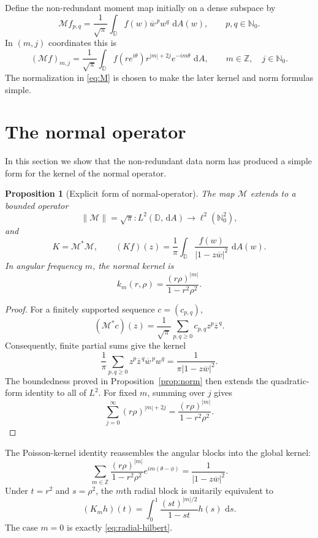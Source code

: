 \IfFileExists{iopjournal.cls}{\documentclass{iopjournal}}{\documentclass{iopjournal-draft}}
\newtheorem{proposition}[theorem]{Proposition}
\theoremstyle{definition}
\theoremstyle{remark}
\newcommand{\D}{\mathbb D}
\newcommand{\dd}{\,\mathrm d}
\newcommand{\norm}[1]{\lVert #1\rVert}
\newcommand{\N}{\mathbb N}
\newcommand{\Z}{\mathbb Z}
\numberwithin{equation}{section}
\begin{document}
Define the non-redundant moment map initially on a dense subspace by
\begin{equation}
 \mathcal{M} f_{p,q}
 =\frac1{\sqrt\pi}\int_{\D}
 f(w)\overline w^{\,p}w^q\,\dd A(w),
 \qquad p,q\in\N_0.
 \label{eq:M}
\end{equation}
In $(m,j)$ coordinates this is
\begin{equation}
 (\mathcal{M}  f)_{m,j}
 =\frac1{\sqrt\pi}\int_{\D}
 f(re^{i\theta})r^{|m|+2j}e^{-im\theta}\,\dd A,
 \qquad m\in\Z,\quad j\in\N_0.
 \label{eq:sigma-mj}
\end{equation}
The normalization in \eqref{eq:M} is chosen to make the later kernel and norm formulas simple.


\section{The normal operator}
\label{sec:normal}
In this section we show that the non-redundant data norm has produced a simple form for the kernel of the normal operator.
\begin{proposition}[Explicit form of normal-operator]
\label{prop:normal-factorization}
The map $\mathcal{M} $ extends to a bounded operator
\[
 \norm{\mathcal M}=\sqrt{\pi}:L^2(\D,\dd A)\longrightarrow\ell^2(\N_0^2),
\]
and
\begin{equation}
 K=\mathcal{M} ^*\mathcal{M},
 \qquad
 (Kf)(z)=\frac1\pi\int_{\D}
 \frac{f(w)}{|1-z\overline w|^2}\,\dd A(w).
 \label{eq:K-definition}
\end{equation}
In angular frequency $m$, the normal kernel is
\begin{equation}
 k_m(r,\rho)=\frac{(r\rho)^{|m|}}{1-r^2\rho^2}.
 \label{eq:angular-block-r}
\end{equation}
\end{proposition}

\begin{proof}
For a finitely supported sequence $c=(c_{p,q})$,
\[
 ( \mathcal{M}^*c)(z)
 =\frac1{\sqrt\pi}\sum_{p,q\geq0}c_{p,q}z^p\overline z^{\,q}.
\]
Consequently, finite partial sums give the kernel
\[
 \frac1\pi\sum_{p,q\geq0}z^p\overline z^{\,q}
 \overline w^{\,p}w^q
 =\frac1{\pi|1-z\overline w|^2}.
\]
The boundedness proved in Proposition~\ref{prop:norm} then extends the quadratic-form identity to all of $L^2$.  For fixed $m$, summing over $j$ gives
\[
 \sum_{j=0}^\infty(r\rho)^{|m|+2j}
 =\frac{(r\rho)^{|m|}}{1-r^2\rho^2}.
\]
\end{proof}

The Poisson-kernel identity reassembles the angular blocks into the
global kernel:
\begin{equation}
 \sum_{m\in\Z}\frac{(r\rho)^{|m|}}{1-r^2\rho^2}
 e^{im(\theta-\phi)}
 =\frac1{|1-z\overline w|^2}.
 \label{eq:block-sum}
\end{equation}
Under $t=r^2$ and $s=\rho^2$, the $m$th radial block is unitarily equivalent to
\begin{equation}
 (K_mh)(t)=\int_0^1\frac{(st)^{|m|/2}}{1-st}h(s)\,\dd s.
 \label{eq:block-t}
\end{equation}
The case $m=0$ is exactly \eqref{eq:radial-hilbert}.
\end{document}
